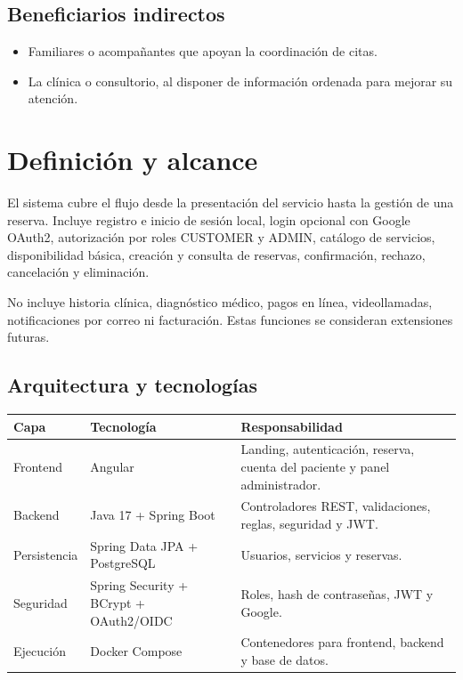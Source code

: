 \documentclass[12pt,a4paper,oneside]{report}
\begin{document}
\subsection{Beneficiarios indirectos}
\begin{itemize}
\item Familiares o acompañantes que apoyan la coordinación de citas.
\item La clínica o consultorio, al disponer de información ordenada para mejorar su atención.
\end{itemize}

\section{Definición y alcance}
El sistema cubre el flujo desde la presentación del servicio hasta la gestión de una reserva. Incluye registro e inicio de sesión local, login opcional con Google OAuth2, autorización por roles CUSTOMER y ADMIN, catálogo de servicios, disponibilidad básica, creación y consulta de reservas, confirmación, rechazo, cancelación y eliminación.

No incluye historia clínica, diagnóstico médico, pagos en línea, videollamadas, notificaciones por correo ni facturación. Estas funciones se consideran extensiones futuras.

\subsection{Arquitectura y tecnologías}
\begin{tabularx}{\textwidth}{|p{3cm}|p{4.2cm}|Y|}
\hline
{}\color{white}\textbf{Capa} & \color{white}\textbf{Tecnología} & \color{white}\textbf{Responsabilidad}\\
\hline
Frontend & Angular & Landing, autenticación, reserva, cuenta del paciente y panel administrador.\\ \hline
Backend & Java 17 + Spring Boot & Controladores REST, validaciones, reglas, seguridad y JWT.\\ \hline
Persistencia & Spring Data JPA + PostgreSQL & Usuarios, servicios y reservas.\\ \hline
Seguridad & Spring Security + BCrypt + OAuth2/OIDC & Roles, hash de contraseñas, JWT y Google.\\ \hline
Ejecución & Docker Compose & Contenedores para frontend, backend y base de datos.\\ \hline
\end{tabularx}
\end{document}
